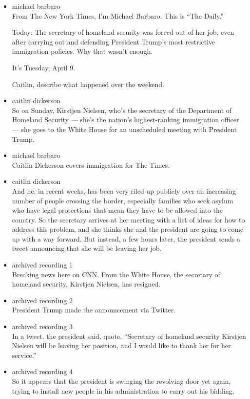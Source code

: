 \begin{itemize}
\item
  michael barbaro\\
  From The New York Times, I'm Michael Barbaro. This is ``The Daily.''

  Today: The secretary of homeland security was forced out of her job,
  even after carrying out and defending President Trump's most
  restrictive immigration policies. Why that wasn't enough.

  It's Tuesday, April 9.

  Caitlin, describe what happened over the weekend.
\item
  caitlin dickerson\\
  So on Sunday, Kirstjen Nielsen, who's the secretary of the Department
  of Homeland Security --- she's the nation's highest-ranking
  immigration officer --- she goes to the White House for an unscheduled
  meeting with President Trump.
\item
  michael barbaro\\
  Caitlin Dickerson covers immigration for The Times.
\item
  caitlin dickerson\\
  And he, in recent weeks, has been very riled up publicly over an
  increasing number of people crossing the border, especially families
  who seek asylum who have legal protections that mean they have to be
  allowed into the country. So the secretary arrives at her meeting with
  a list of ideas for how to address this problem, and she thinks she
  and the president are going to come up with a way forward. But
  instead, a few hours later, the president sends a tweet announcing
  that she will be leaving her job.
\item
  archived recording 1\\
  Breaking news here on CNN. From the White House, the secretary of
  homeland security, Kirstjen Nielsen, has resigned.
\item
  archived recording 2\\
  President Trump made the announcement via Twitter.
\item
  archived recording 3\\
  In a tweet, the president said, quote, ``Secretary of homeland
  security Kirstjen Nielsen will be leaving her position, and I would
  like to thank her for her service.''
\item
  archived recording 4\\
  So it appears that the president is swinging the revolving door yet
  again, trying to install new people in his administration to carry out
  his bidding.
\end{itemize}

